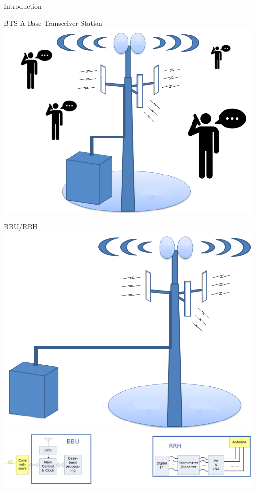 \documentclass[10 pt]{beamer}
\begin{document}
\begin{section}{Introduction}

\begin{frame}{BTS}
  \centering
    A Base Transceiver Station
  \includegraphics[scale=0.3]{btsppl.png}

\end{frame}


\begin{frame}{BBU/RRH}
  \centering
  \includegraphics[scale=0.2]{cloudbts.png}\\
  \includegraphics[scale=0.175]{BBURRH.png}
\end{frame}




\end{section}
\end{document}
